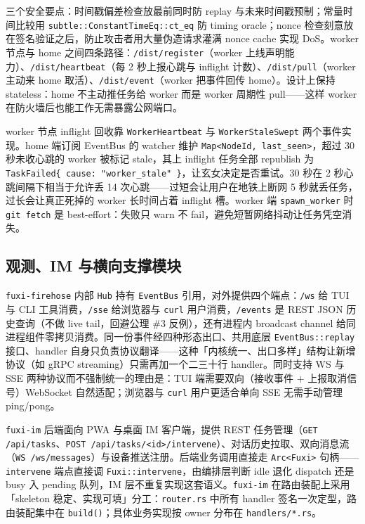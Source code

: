 三个安全要点：时间戳偏差检查放最前同时防 replay 与未来时间戳预制；常量时间比较用 \texttt{subtle::ConstantTimeEq::ct\_eq} 防 timing oracle；nonce 检查刻意放在签名验证之后，防止攻击者用大量伪造请求灌满 nonce cache 实现 DoS。worker 节点与 home 之间四条路径：\texttt{/dist/register}（worker 上线声明能力）、\texttt{/dist/heartbeat}（每 2 秒上报心跳与 inflight 计数）、\texttt{/dist/pull}（worker 主动来 home 取活）、\texttt{/dist/event}（worker 把事件回传 home）。设计上保持 stateless：home 不主动推任务给 worker 而是 worker 周期性 pull——这样 worker 在防火墙后也能工作无需暴露公网端口。

worker 节点 inflight 回收靠 \texttt{WorkerHeartbeat} 与 \texttt{WorkerStaleSwept} 两个事件实现。home 端订阅 EventBus 的 watcher 维护 \texttt{Map<NodeId, last\_seen>}，超过 30 秒未收心跳的 worker 被标记 stale，其上 inflight 任务全部 republish 为 \texttt{TaskFailed\{ cause: "worker\_stale" \}}，让玄女决定是否重试。30 秒在 2 秒心跳间隔下相当于允许丢 14 次心跳——过短会让用户在地铁上断网 5 秒就丢任务，过长会让真正死掉的 worker 长时间占着 inflight 槽。worker 端 \texttt{spawn\_worker} 时 \texttt{git fetch} 是 best-effort：失败只 warn 不 fail，避免短暂网络抖动让任务凭空消失。

\subsection{观测、IM 与横向支撑模块}
\label{subsec:firehose-im-support}

\texttt{fuxi-firehose} 内部 \texttt{Hub} 持有 \texttt{EventBus} 引用，对外提供四个端点：\texttt{/ws} 给 TUI 与 CLI 工具消费，\texttt{/sse} 给浏览器与 \texttt{curl} 用户消费，\texttt{/events} 是 REST JSON 历史查询（不做 live tail，回避公理 \#3 反例），还有进程内 broadcast channel 给同进程组件零拷贝消费。同一份事件经四种形态出口、共用底层 \texttt{EventBus::replay} 接口、handler 自身只负责协议翻译——这种「内核统一、出口多样」结构让新增协议（如 gRPC streaming）只需再加一个二三十行 handler。同时支持 WS 与 SSE 两种协议而不强制统一的理由是：TUI 端需要双向（接收事件 + 上报取消信号）WebSocket 自然适配；浏览器与 \texttt{curl} 用户更适合单向 SSE 无需手动管理 ping/pong。

\texttt{fuxi-im} 后端面向 PWA 与桌面 IM 客户端，提供 REST 任务管理（\texttt{GET /api/tasks}、\texttt{POST /api/tasks/<id>/intervene}）、对话历史拉取、双向消息流（\texttt{WS /ws/messages}）与设备推送注册。后端业务调用直接走 \texttt{Arc<Fuxi>} 句柄——\texttt{intervene} 端点直接调 \texttt{Fuxi::intervene}，由编排层判断 idle 退化 dispatch 还是 busy 入 pending 队列，IM 层不重复实现这套语义。\texttt{fuxi-im} 在路由装配上采用「skeleton 稳定、实现可填」分工：\texttt{router.rs} 中所有 handler 签名一次定型，路由装配集中在 \texttt{build()}；具体业务实现按 owner 分布在 \texttt{handlers/*.rs}。

